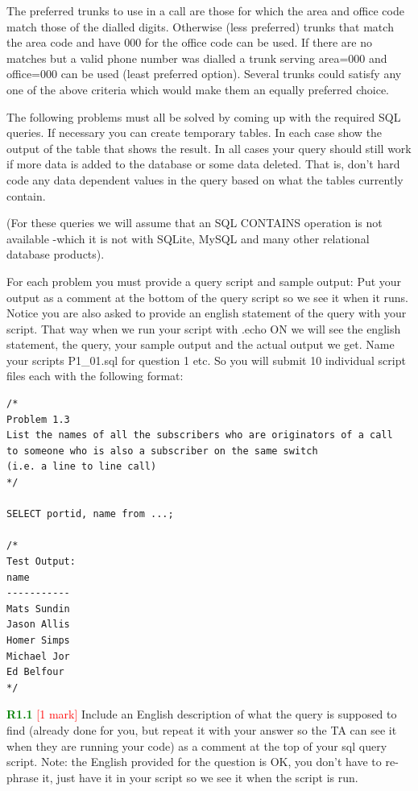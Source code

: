 \documentclass[12pt]{article}
\begin{document}
The preferred trunks to use in a call are those for which the area and office code match those of the dialled digits. Otherwise (less preferred) trunks that match the area code and have 000 for the office code can be used. If there are no matches but a valid phone number was dialled a trunk serving area=000 and office=000 can be used (least preferred option). Several trunks could satisfy any one of the above criteria which would make them an equally preferred choice. \par

The following problems must all be solved by coming up with the required SQL queries. If necessary you can create temporary tables. In each case show the output of the table that shows the result. In all cases your query should still work if more data is added to the database or some data deleted. That is, don't hard code any data dependent values in the query based on what the tables currently contain. \par

{
    \color{red}
    (For these queries we will assume that an SQL CONTAINS operation is not available -which it is not with SQLite, MySQL and many other relational database products).
}

For each problem you must provide a query script and sample output: Put your output as a comment at the bottom of the query script so we see it when it runs. Notice you are also asked to provide an english statement of the query with your script. That way when we run your script with .echo ON we will see the english statement, the query, your sample output and the actual output we get. Name your scripts P1\_01.sql for question 1 etc. So you will submit 10 individual script files each with the following format: \par

\begin{lstlisting}[style=sqlstyle]
/*
Problem 1.3
List the names of all the subscribers who are originators of a call 
to someone who is also a subscriber on the same switch 
(i.e. a line to line call)
*/

SELECT portid, name from ...;

/*
Test Output:
name       
-----------
Mats Sundin
Jason Allis
Homer Simps
Michael Jor
Ed Belfour 
*/
\end{lstlisting}

\textcolor{green}{\textbf{R1.1}} \textcolor{red}{[1 mark]} Include an English description of what the query is supposed to find (already done for you, but repeat it with your answer so the TA can see it when they are running your code) as a comment at the top of your sql query script. Note: the English provided for the question is OK, you don't have to re-phrase it, just have it in your script so we see it when the script is run.
\end{document}
